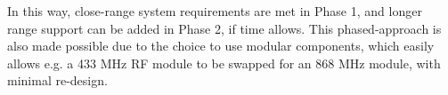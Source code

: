 \noindent In this way, close-range system requirements are met in Phase 1, and longer range support can be added in Phase 2, if time allows. This phased-approach is also made possible due to the choice to use modular components, which easily allows e.g. a 433 MHz RF module to be swapped for an 868 MHz module, with minimal re-design.